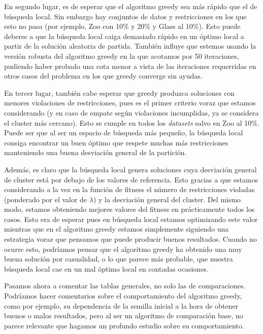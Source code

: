 \documentclass[11pt]{article}
\begin{document}
En segundo lugar, es de esperar que el algoritmo greedy sea más rápido que el de búsqueda local. Sin embargo hay conjuntos de datos y restricciones en los que esto no pasa (por ejemplo, Zoo con 10\% y 20\% y Glass al 10\%). Esto puede deberse a que la búsqueda local caiga demasiado rápido en un óptimo local a partir de la solución aleatoria de partida. También influye que estemos usando la versión robusta del algoritmo greedy en la que acotamos por 50 iteraciones, pudiendo haber probado una cota menor a vista de las iteraciones requerridas en otros casos del problema en los que greedy converge sin ayudas.

En tercer lugar, también cabe esperar que greedy produzca soluciones con menores violaciones de restricciones, pues es el primer criterio voraz que estamos considerando (y en caso de empate según violaciones incumplidas, ya se considera el cluster más cercano). Esto se cumple en todos los \emph{datasets} salvo en Zoo al 10\%. Puede ser que al ser un espacio de búsqueda más pequeño, la búsqueda local consiga encontrar un buen óptimo que respete muchas más restricciones manteniendo una buena desviación general de la partición.

Además, es claro que la búsqueda local genera soluciones cuya desviación general de cluster está por debajo de los valores de referencia. Esto gracias a que estamos considerando a la vez en la función de fitness el número de restricciones violadas (ponderado por el valor de $\lambda$) y la desviación general del cluster. Del mismo modo, estamos obteniendo mejores valores del fitness en prácticamente todos los casos. Esto era de esperar pues en búsqueda local estamos optimizando este valor mientras que en el algoritmo greedy estamos simplemente siguiendo una estrategia voraz que pensamos que puede producir buenos resultados. Cuando no ocurre esto, podríamos pensar que el algoritmo greedy ha obtenido una muy buena solución por casualidad, o lo que parece más probable, que nuestra búsqueda local cae en un mal óptimo local en contadas ocasiones.

Pasamos ahora a comentar las tablas generales, no solo las de comparaciones. Podríamos hacer comentarios sobre el comportamiento del algoritmo greedy, como por ejemplo, su dependencia de la semilla inicial a la hora de obtener buenos o malos resultados, pero al ser un algoritmo de comparación base, no parece relevante que hagamos un profundo estudio sobre su comportamiento.
\end{document}
